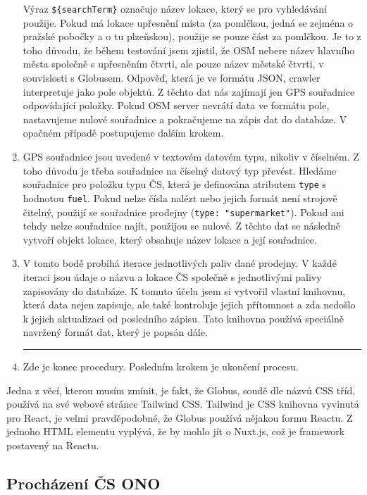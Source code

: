 \begin{enumerate}
        Výraz \texttt{\$\{searchTerm\}} označuje název lokace, který se pro vyhledávání
        použije. Pokud má lokace upřesnění místa (za pomlčkou, jedná se zejména o pražské
        pobočky a o tu plzeňskou), použije se pouze část za pomlčkou. Je to z toho důvodu,
        že během testování jsem zjistil, že OSM nebere název hlavního města společně
        s upřesněním čtvrti, ale pouze název městské čtvrti, v souvislosti s Globusem.
        Odpověď, která je ve formátu JSON, crawler interpretuje jako pole objektů.
        Z těchto dat nás zajímají jen GPS souřadnice odpovídající položky. Pokud OSM server
        nevrátí data ve formátu pole, nastavujeme nulové souřadnice a pokračujeme na zápis
        dat do databáze. V opačném případě postupujeme dalším krokem.
    \item GPS souřadnice jsou uvedené v textovém datovém typu, nikoliv v číselném.
        Z toho důvodu je třeba souřadnice na číselný datový typ převést. Hledáme souřadnice
        pro položku typu ČS, která je definována atributem \texttt{type} s hodnotou
        \texttt{fuel}. Pokud nelze čísla nalézt nebo jejich formát není strojově čitelný,
        použijí se souřadnice prodejny (\texttt{type: "supermarket"}). Pokud ani tehdy nelze
        souřadnice najít, použijou se nulové. Z těchto dat se následně vytvoří objekt lokace,
        který obsahuje název lokace a její souřadnice.
    \item V tomto bodě probíhá iterace jednotlivých paliv dané prodejny. V každé iteraci
        jsou údaje o názvu a lokace ČS společně s jednotlivými palivy zapisovány do databáze.
        K tomuto účelu jsem si vytvořil vlastní knihovnu, která data nejen zapisuje, ale
        také kontroluje jejich přítomnost a zda nedošlo k jejich aktualizaci od posledního
        zápisu. Tato knihovna používá speciálně navržený formát dat, který je popsán dále.
        \hrule
    \item Zde je konec procedury. Posledním krokem je ukončení procesu.
\end{enumerate}

Jedna z věcí, kterou musím zmínit, je fakt, že Globus, soudě dle názvů CSS tříd, používá
na své webové stránce Tailwind CSS. Tailwind je CSS knihovna vyvinutá pro React, je velmi
pravděpodobné, že Globus používá nějakou formu Reactu. Z jednoho HTML elementu vyplývá,
že by mohlo jít o Nuxt.js, což je framework postavený na Reactu.

\subsection{Procházení ČS ONO}

